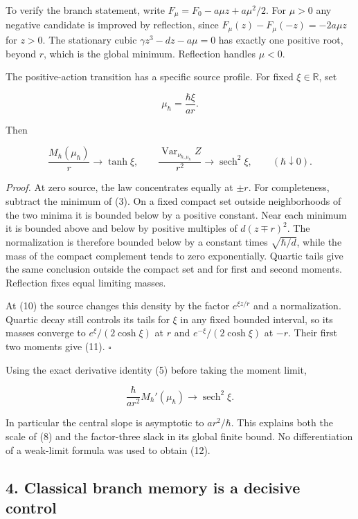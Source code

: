 \documentclass[11pt,a4paper]{article}
\begin{document}
To verify the branch statement, write \(F_\mu=F_0-a\mu z+a\mu^2/2\). For
\(\mu>0\) any negative candidate is improved by reflection, since
\(F_\mu(z)-F_\mu(-z)=-2a\mu z\) for \(z>0\). The stationary cubic
\(\gamma z^3-dz-a\mu=0\) has exactly one positive root, beyond \(r\),
which is the global minimum. Reflection handles \(\mu<0\).

The positive-action transition has a specific source profile. For fixed
\(\xi\in\mathbb R\), set

\[\mu_\hbar=\frac{\hbar\xi}{ar}.\tag{10}\]

Then

\[
 \frac{M_\hbar(\mu_\hbar)}r\longrightarrow\tanh\xi,
 \qquad
 \frac{\operatorname{Var}_{\nu_{\hbar,\mu_\hbar}}Z}{r^2}
       \longrightarrow\operatorname{sech}^2\xi,
 \qquad(\hbar\downarrow0).
 \tag{11}
\]

\emph{Proof.} At zero source, the law concentrates equally at \(\pm r\).
For completeness, subtract the minimum of (3). On a fixed compact set
outside neighborhoods of the two minima it is bounded below by a
positive constant. Near each minimum it is bounded above and below by
positive multiples of \(d(z\mp r)^2\). The normalization is therefore
bounded below by a constant times \(\sqrt{\hbar/d}\), while the mass of
the compact complement tends to zero exponentially. Quartic tails give
the same conclusion outside the compact set and for first and second
moments. Reflection fixes equal limiting masses.

At (10) the source changes this density by the factor \(e^{\xi z/r}\)
and a normalization. Quartic decay still controls its tails for \(\xi\)
in any fixed bounded interval, so its masses converge to
\(e^{\xi}/(2\cosh\xi)\) at \(r\) and \(e^{-\xi}/(2\cosh\xi)\) at \(-r\).
Their first two moments give (11). \(\square\)

Using the exact derivative identity (5) before taking the moment limit,

\[
 \frac{\hbar}{ar^2}M_\hbar'(\mu_\hbar)
       \longrightarrow\operatorname{sech}^2\xi.
 \tag{12}
\]

In particular the central slope is asymptotic to \(ar^2/\hbar\). This
explains both the scale of (8) and the factor-three slack in its global
finite bound. No differentiation of a weak-limit formula was used to
obtain (12).

\subsection{4. Classical branch memory is a decisive
control}\label{classical-branch-memory-is-a-decisive-control}
\end{document}
